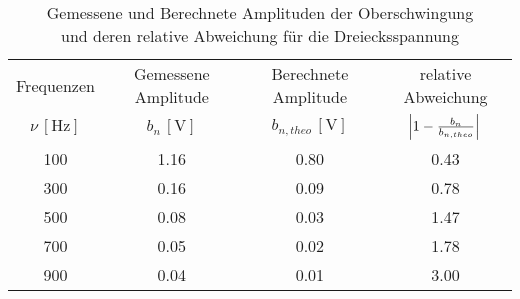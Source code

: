 \begin{table}[!h]
	\centering
	\begin{tabular}{|c|c|c|c|}
		\hline
		Frequenzen & Gemessene Amplitude & Berechnete Amplitude & relative Abweichung\\
		$\nu\,[\si{\hertz}]$ & $b_{n}\,[\si{\volt}]$ & $b_{n,theo}\,[\si{\volt}]$& $\envert{1 - \tfrac{b_{n}}{b_{n,theo}}}$ \\\hline\hline
		\num{100}  & \num{1.16}  & \num{0.80} & \num{0.43}\\
		\num{300}  & \num{0.16}  & \num{0.09} & \num{0.78}\\
		\num{500}  & \num{0.08}  & \num{0.03} & \num{1.47}\\
		\num{700}  & \num{0.05}  & \num{0.02} & \num{1.78}\\
		\num{900}  &\num{0.04}  & \num{0.01} & \num{3.00}\\
		\hline
	\end{tabular}
	\caption{Gemessene und Berechnete Amplituden der Oberschwingung\\ \hspace*{2.1cm}und deren relative Abweichung für die Dreiecksspannung \label{tab:Analyse2}}
\end{table}		